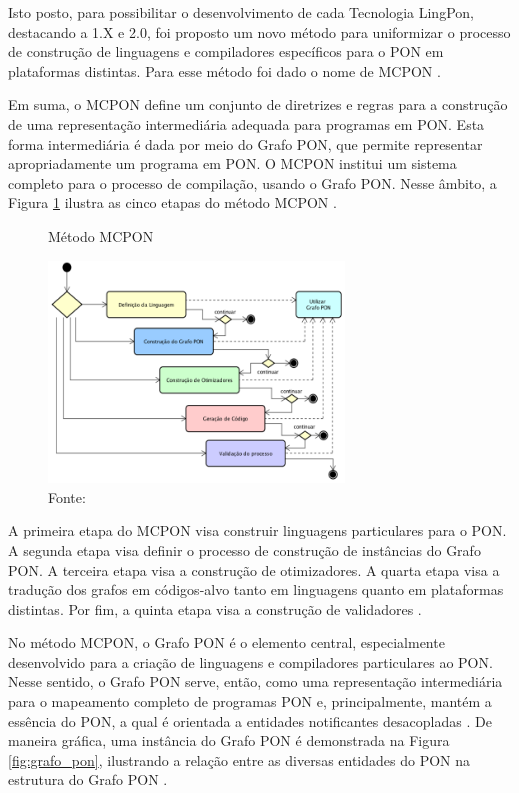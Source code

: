 Isto posto, para possibilitar o desenvolvimento de cada Tecnologia LingPon,
destacando a 1.X e 2.0, foi proposto um novo método para uniformizar o processo
de construção de linguagens e compiladores específicos para o PON em plataformas
distintas. Para esse método foi dado o nome de MCPON \cite{doc_ronszcka_2019}.

\FloatBarrier

Em suma, o MCPON define um conjunto de diretrizes e regras para a construção de
uma representação intermediária adequada para programas em PON. Esta forma
intermediária é dada por meio do Grafo PON, que permite representar
apropriadamente um programa em PON. O MCPON institui um sistema completo para o
processo de compilação, usando o Grafo PON. Nesse âmbito, a Figura
\ref{fig:mcpon} ilustra as cinco etapas do método MCPON
\cite{doc_ronszcka_2019}.

\begin{figure}[!htb]
  \centering
  \caption{Método MCPON}
  \includegraphics[width=0.7\textwidth]{../figures/metodo_mcpon.png}
  \smallskip
  \caption*{Fonte: }
  \label{fig:mcpon}
\end{figure}

A primeira etapa do MCPON visa construir linguagens particulares para o PON. A
segunda etapa visa definir o processo de construção de instâncias do Grafo PON.
A terceira etapa visa a construção de otimizadores. A quarta etapa visa a
tradução dos grafos em códigos-alvo tanto em linguagens quanto em plataformas
distintas. Por fim, a quinta etapa visa a construção de validadores
\cite{doc_ronszcka_2019}.

No método MCPON, o Grafo PON é o elemento central, especialmente desenvolvido
para a criação de linguagens e compiladores particulares ao PON. Nesse sentido,
o Grafo PON serve, então, como uma representação intermediária para o mapeamento
completo de programas PON e, principalmente, mantém a essência do PON, a qual é
orientada a entidades notificantes desacopladas \cite{doc_ronszcka_2019}. De
maneira gráfica, uma instância do Grafo PON é demonstrada na Figura
\ref{fig:grafo_pon}, ilustrando a relação entre as diversas entidades do PON
na estrutura do Grafo PON \cite{msc_negrini_2019}.

